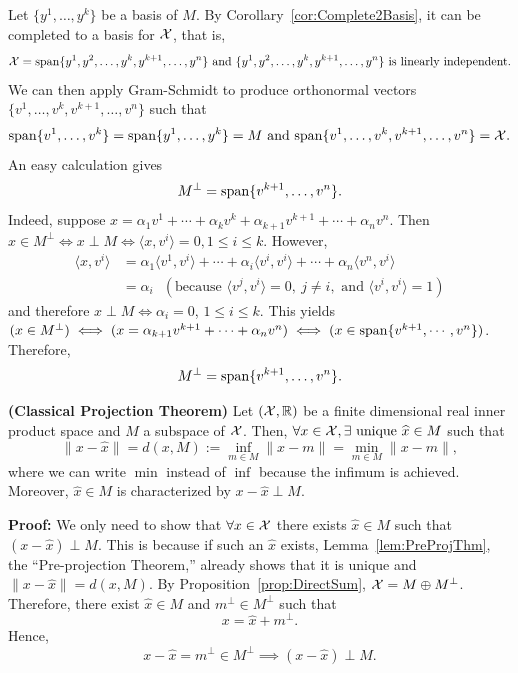 Let $\{y^1, \ldots, y^k\}$ be a basis of $M$. By Corollary~\ref{cor:Complete2Basis},  it can be completed to a basis for $\cal X$, that is, $${\cal X} = \mathrm{span} \{ y^1, y^2, \ldots, y^k, y^{k+1}, \ldots, y^n \} \text{ and } \{y^1, y^2, \ldots, y^k, y^{k+1}, \ldots, y^n \} \text{ is linearly independent}.$$
We can then apply Gram-Schmidt to produce orthonormal vectors $\{v^1, \ldots, v^k, v^{k+1}, \ldots, v^n\}$ such that $$\mathrm{span} \{ v^1, \ldots, v^k \} = \mathrm{span} \{ y^1, \ldots, y^k \} = M \text{ and } \mathrm{span} \{ v^1, \ldots, v^k, v^{k+1}, \ldots, v^n \} ={\cal X}.$$
An easy calculation gives
    $$M^{\perp} = \mathrm{span} \{ v^{k+1}, \ldots, v^n \}.$$
Indeed, suppose $x = \alpha_1 v^1 + \cdots + \alpha_k v^k + \alpha_{k+1} v^{k+1} + \cdots + \alpha_n v^n$. Then $x \in M^\perp \iff x \perp M \iff \langle x, v^i \rangle =0, 1 \leq i \leq k $. However, 
    \begin{align*}
        \langle x, v^i \rangle  &= \alpha_1  \langle v^1, v^i \rangle  + \cdots + \alpha_i  \langle v^i, v^i \rangle  + \cdots + \alpha_n  \langle v^n, v^i \rangle\\
        &= \alpha_i ~~~ (\text{because }  \langle v^j, v^i \rangle = 0, ~j \neq i, \text{ and } \langle v^i, v^i \rangle = 1)
    \end{align*}
    and therefore $x \perp M \iff \alpha_i = 0$, $1 \le i \le k$. This yields
$(x \in M^\perp) \iff (x = \alpha_{k+1} v^{k+1} + \cdots + \alpha_n v^n) \iff (x \in \mathrm{span} \{ v^{k+1}, \cdots, v^n \})$. Therefore,
$$ M^{\perp} =\mathrm{span} \{ v^{k+1}, \ldots, v^n \}.$$
\Qed


\begin{thm} 
\label{thm:ClassicalProjThm}
\textbf{(Classical Projection Theorem)}  Let $({\cal X}, \mathbb R)$ be a finite dimensional real inner product space and $M$ a subspace of $\cal X$. Then, $\forall x \in {\cal X}, \exists \textnormal{ unique }\widehat{x} \in M$ such that
    \begin{equation*}
        \|x - \widehat{x}\| = d(x, M) := \inf\limits_{m \in M} \|x - m\| =\min\limits_{m \in M} \|x - m\|,
    \end{equation*}
    where we can write $\min$ instead of $\inf$ because the infimum is achieved. Moreover, $\widehat{x} \in M$ is characterized by $x-\widehat{x} \perp M$.
        
\end{thm}

\textbf{Proof:} We only need to show that $\forall x \in {\cal X}$ there exists $\widehat{x} \in M$ such that $(x - \widehat{x}) \perp M$. This is because if such an $\widehat{x}$ exists,  Lemma~\ref{lem:PreProjThm}, the ``Pre-projection Theorem,'' already shows that it is unique and $ \|x - \widehat{x}\| = d(x, M)$. By Proposition~\ref{prop:DirectSum}, ${\cal X} = M \oplus M^{\perp}$. Therefore, there exist $\widehat{x} \in M$ and $m^\perp \in M^\perp$
such that
    $$x = \widehat{x} + m^\perp.$$
    Hence,
    $$x-\widehat{x} = m^\perp \in M^\perp \implies (x-\widehat{x}) \perp M.$$
    \Qed

